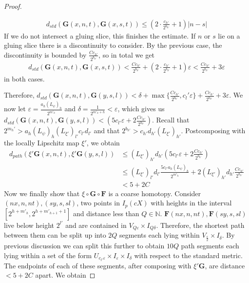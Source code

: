 \documentclass[10pt,a4paper]{amsart}
\begin{document}
\begin{proof}
\begin{enumerate}
\begin{align*}
d_{std}(\mathbf{G}(x,n,t), \mathbf{G}(x,s,t))\leq (2\cdot \frac{c_{h'}}{2^{b_{h'}}}+1) |n-s|
\end{align*}
If we do not intersect a gluing slice, this finishes the estimate. If $n$ or $s$ lie on a gluing slice there is a discontinuity to consider. By the previous case, the discontinuity is bounded by $\frac{Cc_{h'}}{2^{b_{h'}}}$, so in total we get
\begin{align*}
d_{std}(\mathbf{G}(x,n,t), \mathbf{G}(x,s,t))< \frac{Cc_{h'}}{2^{b_{h'}}} + (2\cdot \frac{c_{h'}}{2^{b_{h'}}}+1) \varepsilon <\frac{Cc_{h'}}{2^{b_{h'}}} + 3\varepsilon
\end{align*}  
in both cases.
\end{enumerate} 

Therefore, $d_{std}(\mathbf{G}(x,n,t),\mathbf{G}(y,s,l))<  \delta +\max\{\frac{Cc_{h'}}{2^{b_{h'}}},c_{l}'\varepsilon\}+\frac{Cc_{h'}}{2^{b_{h'}}} + 3\varepsilon$. We now let $\varepsilon =  \frac{a_{h}(L_{\psi})_{h}}{2^{m'_{h}}}$ and $\delta = \frac{1}{2^{m'_{h}+h}}<\varepsilon$, which gives us $d_{std}(\mathbf{G}(x,n,t),\mathbf{G}(y,s,l))<  (5c_{l'}\varepsilon + 2\frac{Cc_{h'}}{2^{b_{h'}}})$. Recall that $2^{m_{h}'}> a_{h} (L_{\psi})_{h} (L_{\xi'})_{l'}c_{l'}d_{l'}$ and that $2^{b_{h'}} > c_{h'}d_{h'} (L_{\xi'})_{h'}$.  Postcomposing with the locally Lipschitz map $\xi'$, we obtain 
\begin{align*}
d_{path}(\xi'\mathbf{G}(x,n,t),\xi'\mathbf{G}(y,s,l))&\leq (L_{\xi'})_{h'} d_{h'} (5c_{l'}\varepsilon + 2\frac{Cc_{h'}}{2^{b_{h'}}})\\
&\leq (L_{\xi'})_{l'}d_{l'}\frac{5c_{l'}a_{h}(L_{\psi})_{h}}{2^{m'_{h}}} +2(L_{\xi'})_{h'} d_{h'}\frac{Cc_{h'}}{2^{b_{h'}}}\\
&<5 +2C
\end{align*}
Now we finally show that $\xi\circ \mathbf{G}\circ \mathbf{F}$ is a coarse homotopy. Consider $(nx,n,nt),(sy,s,sl)$, two points in $I_{p}(cX)$ with heights in the interval $ [2^{h+m'_{h}},2^{h+m'_{h+1}+1}]$ and distance less than $Q\in \mathbb{N}$. $\mathbf{F}(nx,n,nt), \mathbf{F}(sy,s,sl)$ live below height $2^{l'}$ and are contained in $V_{Q\varepsilon} \times I_{Q\delta}$. Therefore, the shortest path between them can be split up into $2Q$ segments each lying within $V_{\frac{\varepsilon}{2}} \times I_{\delta}$. By previous discussion we can split this further to obtain $10Q$ path segments each lying within a set of the form $U_{c_{l'}\varepsilon} \times I_{\varepsilon} \times I_{\delta}$ with respect to the standard metric. The endpoints of each of these segments, after composing with $\xi' \mathbf{G}$, are distance $< 5+2C$ apart. We obtain

\end{proof}
\end{document}
